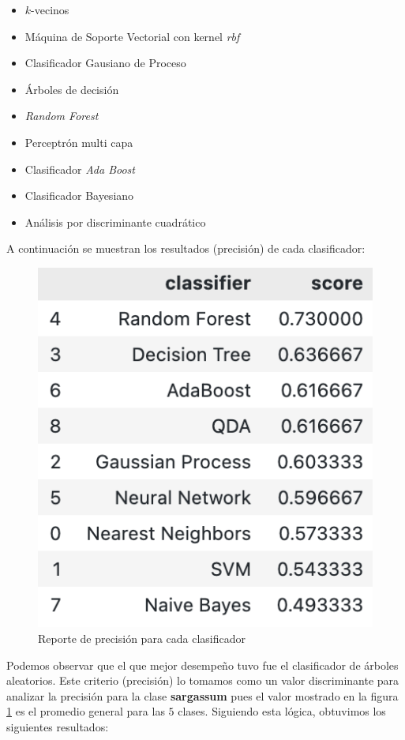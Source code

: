 \documentclass[conference]{IEEEtran}
\begin{document}
\begin{itemize}
	\item $k$-vecinos
    \item Máquina de Soporte Vectorial con kernel \textit{rbf}
    \item Clasificador Gausiano de Proceso
    \item Árboles de decisión
    \item \textit{Random Forest}
    \item Perceptrón multi capa
    \item Clasificador \textit{Ada Boost}
    \item Clasificador Bayesiano
    \item Análisis por discriminante cuadrático
\end{itemize}

A continuación se muestran los resultados (precisión) de cada clasificador: 

\begin{figure}[H]
    \centering
    \includegraphics[scale=0.4]{imgs/classifiers_report.png}
    \caption{Reporte de precisión para cada clasificador}
    \label{fig:clfs}
\end{figure}

Podemos observar que el que mejor desempeño tuvo fue el clasificador de árboles aleatorios. Este criterio (precisión) lo tomamos como un valor discriminante para analizar la precisión para la clase \textbf{sargassum} pues el valor mostrado en la figura \ref{fig:clfs} es el promedio general para las $5$ clases. Siguiendo esta lógica, obtuvimos los siguientes resultados:
\end{document}

